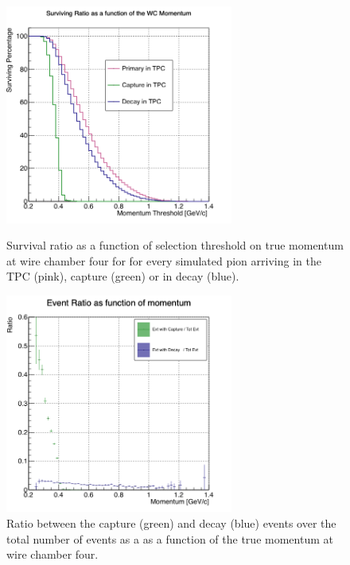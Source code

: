 \begin{figure}[h!]
\centering
\begin{minipage}[t]{0.45\textwidth}
\centering
\includegraphics[width=7.5cm]{Chapter-7/Images/CDThreshold.png}
\caption{Survival ratio as a function of selection threshold on true momentum at wire chamber four for for every simulated pion arriving in the TPC (pink), capture (green) or in decay (blue).   }
\label{fig:survRatio}
\end{minipage}\hfill
\begin{minipage}[t]{0.45\textwidth}
\centering
\includegraphics[width=7.5cm]{Chapter-7/Images/CDRatio.png}
\caption{Ratio between the capture (green) and decay (blue) events over the total number of events as a as a function of the true momentum at wire chamber four.}
\label{fig:evtRatio}
\end{minipage}
\end{figure}














